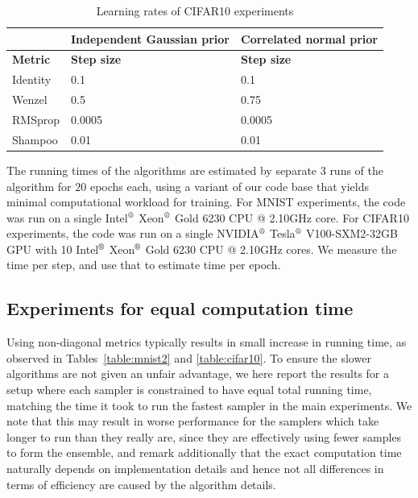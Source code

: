 \documentclass[10pt]{article} %
\theoremstyle{plain}
\theoremstyle{definition}
\theoremstyle{remark}
\begin{document}
\begin{table}[t]
\begin{center}
\begin{tabular}{l|l|l}
  & Independent Gaussian prior &
 Correlated normal prior \\
\hline
{\bf Metric}                   & {\bf Step size}
& {\bf Step size} \\
\hline
Identity & 0.1 & 0.1 \\
Wenzel & 0.5 & 0.75 \\
RMSprop & 0.0005 & 0.0005 \\
Shampoo & 0.01 & 0.01 \\
\hline
\end{tabular}
\caption{Learning rates of CIFAR10 experiments}
\label{table:cifar10lrs}
\end{center}
\end{table}

The running times of the algorithms are estimated by separate $3$ runs of the algorithm for $20$ epochs each, using a variant of our code base that yields minimal computational workload for training. For MNIST experiments, the code was run on a single Intel$\textsuperscript{\textregistered}$ Xeon$\textsuperscript{\textregistered}$ Gold 6230 CPU @ 2.10GHz core. For CIFAR10 experiments, the code was run on a single NVIDIA$\textsuperscript{\textregistered}$ Tesla$\textsuperscript{\textregistered}$ V100-SXM2-32GB GPU with 10 Intel$\textsuperscript{\textregistered}$ Xeon$\textsuperscript{\textregistered}$ Gold 6230 CPU @ 2.10GHz cores. We measure the time per step, and use that to estimate time per epoch.

\subsection{Experiments for equal computation time}
\label{app:fixedtime}

Using non-diagonal metrics typically results in small increase in running time, as observed in Tables~\ref{table:mnist2} and \ref{table:cifar10}. To ensure the slower algorithms are not given an unfair advantage, we here report the results for a setup where each sampler is constrained to have equal total running time, matching the time it took to run the fastest sampler in the main experiments. We note that this may result in worse performance for the samplers which take longer to run than they really are, since they are effectively using fewer samples to form the ensemble, and remark additionally that the exact computation time naturally depends on implementation details and hence not all differences in terms of efficiency are caused by the algorithm details.
\end{document}
